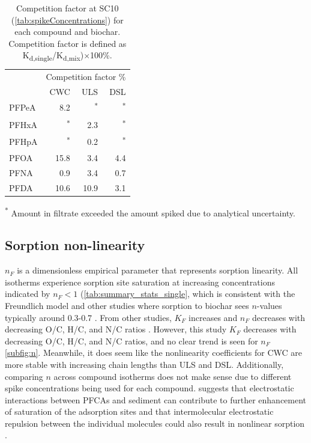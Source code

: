 \begin{table}
\centering
\caption{Competition factor at SC10 (\cref{tab:spikeConcentrations}) for each compound and biochar. Competition factor is defined as K\textsubscript{d,single}/K\textsubscript{d,mix})$\times$100\%.}
\begin{threeparttable}
\label{tab:competition}
\begin{tabular}{lrrr}
\toprule
 & \multicolumn{3}{c}{Competition factor \%} \\ \cmidrule(l){2-4}
 & CWC & ULS & DSL \\ \midrule
PFPeA & 8.2 & \textsuperscript{*} & \textsuperscript{*} \\
PFHxA & \textsuperscript{*} & 2.3 & \textsuperscript{*} \\
PFHpA & \textsuperscript{*} & 0.2 & \textsuperscript{*} \\
PFOA & 15.8 & 3.4 & 4.4 \\
PFNA & 0.9 & 3.4 & 0.7 \\
PFDA & 10.6 & 10.9 & 3.1 \\ \bottomrule
\end{tabular}
\begin{tablenotes}
\item \textsuperscript{*} Amount in filtrate exceeded the amount spiked due to analytical uncertainty.
\end{tablenotes}
\end{threeparttable}
\end{table}

\subsection{Sorption non-linearity}
$n_F$ is a dimensionless empirical parameter that represents sorption linearity. All isotherms experience sorption site saturation at increasing concentrations indicated by $n_F<1 $ (\cref{tab:summary_stats_single}, which is consistent with the Freundlich model and other studies where sorption to biochar sees $n$-values typically around 0.3-0.7 \citep{Cornelissen2005}. From other studies, $K_F$ increases and $n_F$ decreases with decreasing O/C, H/C, and N/C ratios \citep{Cornelissen2005}. However, this study $K_F$ decreases with decreasing O/C, H/C, and N/C ratios, and no clear trend is seen for $n_F$ \cref{subfig:n}. Meanwhile, it does seem like the nonlinearity coefficients for CWC are more stable with increasing chain lengths than ULS and DSL. Additionally, comparing $n$ across compound isotherms does not make sense due to different spike concentrations being used for each compound. \citep{yin2022insights} suggests that electrostatic interactions between PFCAs and sediment can contribute to further enhancement of saturation of the adsorption sites and that intermolecular electrostatic repulsion between the individual molecules could also result in nonlinear sorption \citep{higgins2006sorption,yin2022insights}.

